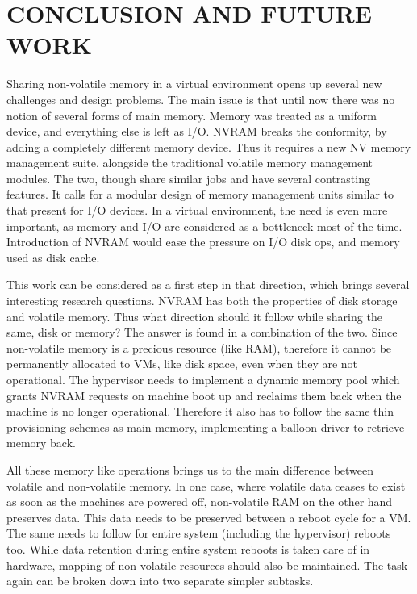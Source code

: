 
\chapter{\uppercase{Conclusion and Future Work}}

Sharing non-volatile memory in a virtual environment opens up several new challenges and design problems. The main issue is that until now there was no notion of several forms of main memory. Memory was treated as a uniform device, and everything else is left as I/O. NVRAM breaks the conformity, by adding a completely different memory device. Thus it requires a new NV memory management suite, alongside the traditional volatile memory management modules. The two, though share similar jobs and have several contrasting features. It calls  for a modular design of memory management units similar to that present for I/O devices. In a virtual environment, the need is even more important, as memory and I/O are considered as a bottleneck most of the time. Introduction of NVRAM would ease the pressure on I/O disk ops, and memory used as disk cache. 

This work can be considered as a first step in that direction, which brings several interesting research questions. NVRAM has both the properties of disk storage and volatile memory. Thus what direction should it follow while sharing the same, disk or memory? The answer is found in a combination of the two. Since non-volatile memory is a precious resource (like RAM), therefore it cannot be permanently allocated to VMs, like disk space, even when they are not operational. The hypervisor needs to implement a dynamic memory pool which grants NVRAM requests on machine boot up and reclaims them back when the machine is no longer operational. Therefore it also has to follow the same thin provisioning schemes as main memory, implementing a balloon driver to retrieve memory back.  

All these memory like operations brings us to the main difference between volatile and non-volatile memory. In one case, where volatile data ceases to exist as soon as the machines are powered off, non-volatile RAM on the other hand preserves data. This data needs to be preserved between a reboot cycle for a VM. The same needs to follow for entire system (including the hypervisor) reboots too. While data retention during entire system reboots is taken care of in hardware, mapping of non-volatile resources should also be maintained. The task again can be broken down into two separate simpler subtasks.  

